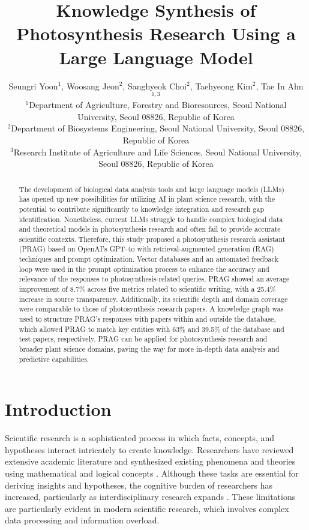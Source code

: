 \documentclass[12pt]{article}
\title{\textbf{Knowledge Synthesis of Photosynthesis Research Using a Large Language Model}\vspace{-0.5ex}}
\author{
\begin{minipage}{\textwidth}
\hspace*{0.5cm}  
\centering
\setstretch{1.2}
Seungri Yoon$^{1}$, Woosang Jeon$^{2}$, Sanghyeok Choi$^{2}$, Taehyeong Kim$^{2}$\footnotemark[1], Tae In Ahn$^{1,3}$\footnotemark[1]\\[0.5ex]
{\small
$^{1}$Department of Agriculture, Forestry and Bioresources, Seoul National University, Seoul 08826, Republic of Korea\\[0.2ex]
$^{2}$Department of Biosystems Engineering, Seoul National University, Seoul 08826, Republic of Korea\\[0.2ex]
$^{3}$Research Institute of Agriculture and Life Sciences, Seoul National University, Seoul 08826, Republic of Korea\\[0.2ex]
}
\end{minipage}
}
\date{}
\begin{document}
\raggedbottom

\maketitle

\renewcommand{\thefootnote}{\fnsymbol{footnote}}


\begin{abstract}
The development of biological data analysis tools and large language models (LLMs) has opened up new possibilities for utilizing AI in plant science research, with the potential to contribute significantly to knowledge integration and research gap identification. Nonetheless, current LLMs struggle to handle complex biological data and theoretical models in photosynthesis research and often fail to provide accurate scientific contexts. Therefore, this study proposed a photosynthesis research assistant (PRAG) based on OpenAI's GPT-4o with retrieval-augmented generation (RAG) techniques and prompt optimization. Vector databases and an automated feedback loop were used in the prompt optimization process to enhance the accuracy and relevance of the responses to photosynthesis-related queries. PRAG showed an average improvement of 8.7\% across five metrics related to scientific writing, with a 25.4\% increase in source transparency. Additionally, its scientific depth and domain coverage were comparable to those of photosynthesis research papers. A knowledge graph was used to structure PRAG's responses with papers within and outside the database, which allowed PRAG to match key entities with 63\% and 39.5\% of the database and test papers, respectively. PRAG can be applied for photosynthesis research and broader plant science domains, paving the way for more in-depth data analysis and predictive capabilities.
\end{abstract}

\section{Introduction}
Scientific research is a sophisticated process in which facts, concepts, and hypotheses interact intricately to create knowledge. Researchers have reviewed extensive academic literature and synthesized existing phenomena and theories using mathematical and logical concepts \cite{ref1}. Although these tasks are essential for deriving insights and hypotheses, the cognitive burden of researchers has increased, particularly as interdisciplinary research expands \cite{ref1, ref2, ref3, ref4}. These limitations are particularly evident in modern scientific research, which involves complex data processing and information overload.
\end{document}
